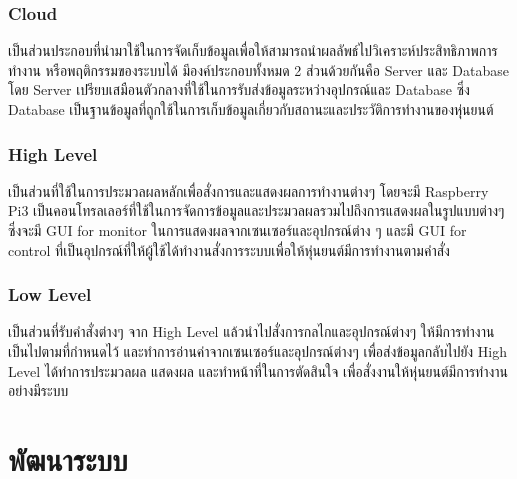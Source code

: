 \documentclass{classes/fiboreport}
\begin{document}
\subsection{Cloud}
เป็นส่วนประกอบที่นำมาใช้ในการจัดเก็บข้อมูลเพื่อให้สามารถนำผลลัพธ์ไปวิเคราะห์ประสิทธิภาพการทำงาน
หรือพฤติกรรมของระบบได้ มีองค์ประกอบทั้งหมด 2 ส่วนด้วยกันคือ Server และ Database โดย Server 
เปรียบเสมือนตัวกลางที่ใช้ในการรับส่งข้อมูลระหว่างอุปกรณ์และ Database ซึ่ง Database 
เป็นฐานข้อมูลที่ถูกใช้ในการเก็บข้อมูลเกี่ยวกับสถานะและประวัติการทำงานของหุ่นยนต์

\subsection{High Level}
เป็นส่วนที่ใช้ในการประมวลผลหลักเพื่อสั่งการและแสดงผลการทำงานต่างๆ โดยจะมี Raspberry Pi3
เป็นคอนโทรลเลอร์ที่ใช้ในการจัดการข้อมูลและประมวลผลรวมไปถึงการแสดงผลในรูปแบบต่างๆ
ซึ่งจะมี GUI for monitor ในการแสดงผลจากเซนเซอร์และอุปกรณ์ต่าง ๆ และมี GUI for control
ที่เป็นอุปกรณ์ที่ให้ผู้ใช้ได้ทำงานสั่งการระบบเพื่อให้หุ่นยนต์มีการทำงานตามคำสั่ง

\subsection{Low Level}
เป็นส่วนที่รับคำสั่งต่างๆ จาก High Level แล้วนำไปสั่งการกลไกและอุปกรณ์ต่างๆ
ให้มีการทำงานเป็นไปตามที่กำหนดไว้ และทำการอ่านค่าจากเซนเซอร์และอุปกรณ์ต่างๆ
เพื่อส่งข้อมูลกลับไปยัง High Level ได้ทำการประมวลผล แสดงผล และทำหน้าที่ในการตัดสินใจ
เพื่อสั่งงานให้หุ่นยนต์มีการทำงานอย่างมีระบบ





\chapter{พัฒนาระบบ}
\end{document}
